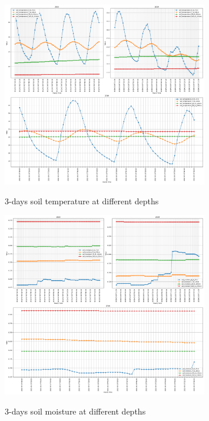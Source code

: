 \begin{figure}[h]
	\centering
	\caption{3-days soil temperature at different depths }
	\includegraphics[width=0.8\textwidth]{graphs/weather_variables/3_soil_temperature_0_to_7cm_soil_temperature_7_to_28cm_soil_temperature_28_to_100cm.png}
	\label{fig:soil_temp_3day}
\end{figure}

\begin{figure}[h]
	\centering
	\caption{3-days soil moisture at different depths }
	\includegraphics[width=0.8\textwidth]{graphs/weather_variables/3_soil_moisture_0_to_7cm_soil_moisture_7_to_28cm_soil_moisture_28_to_100cm.png}
	\label{fig:soil_moist_3day}
\end{figure}

